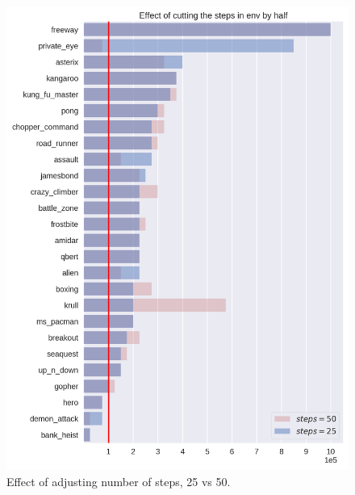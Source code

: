 \begin{figure}
\centering
\includegraphics[width=0.9\columnwidth]{figures/eval_sd_s25.png}
\caption{Effect of adjusting number of steps, 25 vs 50.} 
\label{fig:adj_steps_2}
\end{figure}


